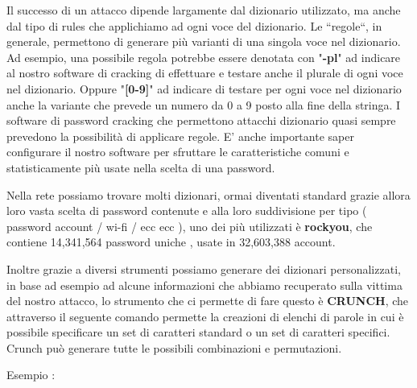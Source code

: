 Il successo di un attacco dipende largamente dal dizionario utilizzato, ma anche dal tipo di rules che applichiamo ad ogni voce del dizionario. Le “regole“, in generale, permettono di generare più varianti di una singola voce nel dizionario. Ad esempio, una possibile regola potrebbe essere denotata con "\textbf{-pl}" ad indicare al nostro software di cracking di effettuare e testare anche il plurale di ogni voce nel dizionario. Oppure "\textbf{[0-9]}" ad indicare di testare per ogni voce nel dizionario anche la variante che prevede un numero da 0 a 9 posto alla fine della stringa. I software di password cracking che permettono attacchi dizionario quasi sempre prevedono la possibilità di applicare regole. E’ anche importante saper configurare il nostro software per sfruttare le caratteristiche comuni e statisticamente più usate nella scelta di una password.

Nella rete possiamo trovare molti dizionari, ormai diventati standard grazie allora loro vasta scelta di password contenute e alla loro suddivisione per tipo ( password account / wi-fi / ecc ecc ), uno dei più utilizzati è \textbf{rockyou}, che contiene 14,341,564 password uniche , usate in 32,603,388 account.

Inoltre grazie a diversi strumenti possiamo generare dei dizionari personalizzati, in base ad esempio ad alcune informazioni che abbiamo recuperato sulla vittima del nostro attacco, lo strumento che ci permette di fare questo è \textbf{CRUNCH}\cite{CRUNCH}, che attraverso il seguente comando permette la creazioni di elenchi di parole in cui è possibile specificare un set di caratteri standard o un set di caratteri specifici. Crunch può generare tutte le possibili combinazioni e permutazioni. 

Esempio :

